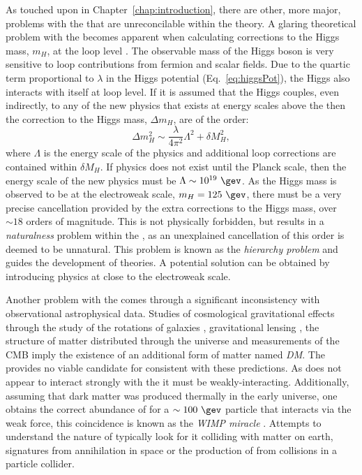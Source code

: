 As touched upon in Chapter~\ref{chap:introduction}, there are other,
more major, problems with the \SM that are unreconcilable within the
theory. A glaring theoretical problem with the \SM becomes apparent
when calculating corrections to the Higgs mass, $m_H$, at the loop
level \cite{Martin:1997ns}. The observable mass of the Higgs boson is
very sensitive to loop contributions from fermion and scalar fields.
Due to the quartic term proportional to $\lambda$ in the Higgs
potential (Eq.~\ref{eq:higgsPot}), the Higgs also interacts with itself
at loop level. If it is assumed that the Higgs couples, even indirectly, to
any of the new physics that exists at energy scales above the \SM then the
correction to the Higgs mass, $\Delta m_H$, are of the order:
\begin{equation}
\label{higgsmassscale}
\Delta m_H^2 \sim \frac{\lambda}{4\pi^2}\Lambda^2+\delta M_H^2,
\end{equation}
where $\Lambda$ is the energy scale of the \BSM physics and additional
loop corrections are contained within $\delta M_H$. If \BSM
physics does not exist until the Planck scale, then the energy scale
of the new physics must be $\Lambda\sim 10^{19}~\gev$. As the Higgs
mass is observed to be at the electroweak scale, $m_H=125~\gev$, there
must be a very precise cancellation provided by the extra corrections
to the Higgs mass, over $\sim18$ orders of magnitude. This is not
physically forbidden, but results in a \emph{naturalness} problem
within the \SM, as an unexplained cancellation of this order is deemed to
be unnatural. This problem is known as the \emph{hierarchy problem}
and guides the development of \BSM theories. A potential solution can
be obtained by introducing \BSM physics at close to the electroweak scale.

Another problem with the \SM comes through a significant inconsistency
with observational astrophysical data. Studies of cosmological
gravitational effects through the study of the rotations of galaxies
\cite{Kapteyn:1922zz,Oort:436532}, gravitational lensing
\cite{Markevitch:2003at}, the structure of matter distributed through
the universe \cite{2012Natur.487..202D} and measurements of the
\ac{CMB} \cite{Ade:2015xua,0067-0049-180-2-225} imply the existence of
an additional form of matter named \emph{\acf{DM}}. The \SM provides
no viable candidate for \DM consistent with these predictions. As \DM
does not appear to interact strongly with the \SM it must be
weakly-interacting. Additionally, assuming that dark matter was
produced thermally in the early universe, one obtains the correct
abundance of \DM for a $\sim 100~\gev$ particle that interacts via the
weak force, this coincidence is known as the \emph{WIMP miracle}
\cite{Jungman:1995df}. Attempts to understand the nature of \DM
typically look for it colliding with matter on earth, signatures from
\DM annihilation in space or the production of \DM from \SM collisions
in a particle collider. %

